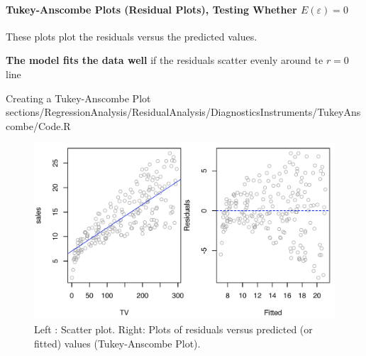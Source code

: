 \paragraph{Tukey-Anscombe Plots (Residual Plots), Testing Whether $E(\varepsilon) = 0$}
	These plots plot the residuals versus the predicted values.
	
	\textbf{The model fits the data well} if the residuals scatter evenly around te $r=0$ line
	
	\RCode
	{
		Creating a Tukey-Anscombe Plot
	}
	{
		sections/RegressionAnalysis/ResidualAnalysis/DiagnosticsInstruments/TukeyAnscombe/Code.R
	}
	
	\begin{figure}[H]\centering
		\includegraphics[width=0.8\linewidth]{images/TukeyAnscombe.png}
		\caption{Left : Scatter plot. Right: Plots of residuals versus predicted (or fitted) values (Tukey-Anscombe Plot).}
	\end{figure}